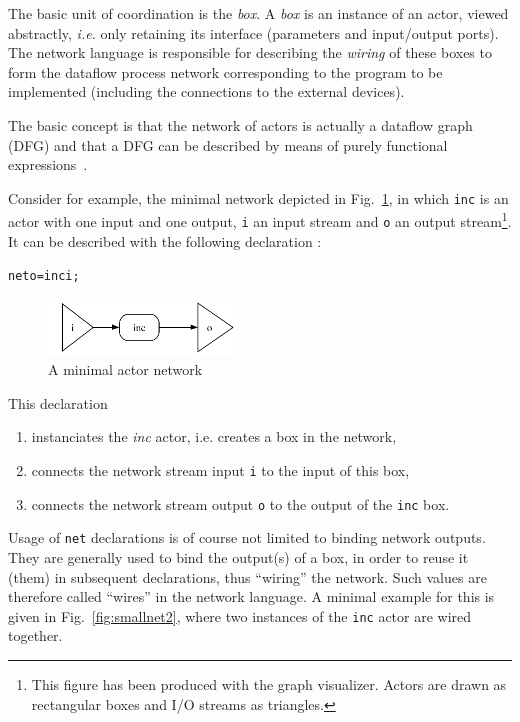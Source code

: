 The basic unit of coordination is the {\it box}. A \emph{box} is an instance of an actor, viewed
abstractly, \emph{i.e.} only retaining its interface (parameters and input/output ports). 
The network language is responsible for describing the \emph{wiring} of these boxes to form the
dataflow process network corresponding to the program to be implemented (including the connections to the
external devices).  

The basic concept is that the network of actors is actually a dataflow graph (DFG) and that a DFG can
be described by means of purely functional expressions~\cite{SerotQZ95}.

Consider for example, the minimal network depicted in Fig.~\ref{fig:smallnet1}, in which
\texttt{inc} is an actor with one input and one output, \texttt{i} an input stream and \texttt{o}
an output stream\footnote{This figure has been produced with the \caph graph visualizer. Actors are
  drawn as rectangular boxes and I/O streams as triangles.}. It can be described with the following
\caph declaration :

\begin{alltt}
net o = inc i;
\end{alltt}

\begin{figure}[h]
  \centering
  \includegraphics[height=1.5cm]{figs/smallnet1}
  \caption{A minimal actor network}
  \label{fig:smallnet1}
\end{figure}

This declaration
\begin{enumerate}
\item instanciates the \emph{inc} actor, i.e. creates a box in the network,
\item connects the network stream input \texttt{i} to the input of this box,
\item connects the network stream output \texttt{o} to the output of the \texttt{inc} box.
\end{enumerate}

\medskip Usage of \texttt{net} declarations is of course not limited to binding network
outputs. They are generally used to bind the output(s) of a box, in order to reuse it (them) in subsequent
declarations, thus ``wiring'' the network. Such values are therefore called ``wires'' in the network language. A
minimal example for this is given in Fig.~\ref{fig:smallnet2}, where two instances of the
\texttt{inc} actor are wired together.

